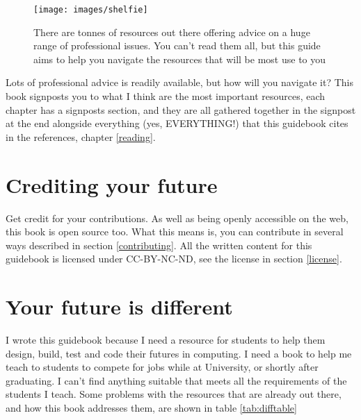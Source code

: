 \documentclass[
]{book}
\begin{document}
\begin{figure}

{\centering \texttt{[image: images/shelfie]} 

}

\caption{There are tonnes of resources out there offering advice on a huge range of professional issues. You can't read them all, but this guide aims to help you navigate the resources that will be most use to you}\label{fig:shelfie-fig}
\end{figure}



Lots of professional advice is readily available, but how will you navigate it? This book signposts you to what I think are the most important resources, each chapter has a signposts section, and they are all gathered together in the signpost at the end alongside everything (yes, EVERYTHING!) that this guidebook cites in the references, chapter \ref{reading}.

\hypertarget{crediting}{%
\section{Crediting your future}\label{crediting}}

Get credit for your contributions. As well as being openly accessible on the web, this book is open source too. What this means is, you can contribute in several ways described in section \ref{contributing}. All the written content for this guidebook is licensed under CC-BY-NC-ND, see the license in section \ref{license}.

\hypertarget{thinkdifferent}{%
\section{Your future is different}\label{thinkdifferent}}

I wrote this guidebook because I need a resource for students to help them design, build, test and code their futures in computing. I need a book to help me teach to students to compete for jobs while at University, or shortly after graduating. I can't find anything suitable that meets all the requirements of the students I teach. Some problems with the resources that are already out there, and how this book addresses them, are shown in table \ref{tab:difftable}
\end{document}
